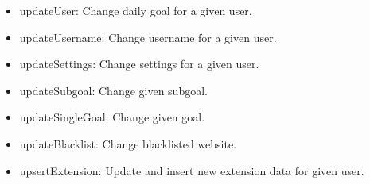 \documentclass[letterpaper, 10 pt]{report}
\begin{document}
\begin{itemize}
 \item updateUser: Change daily goal for a given user.
 \item updateUsername: Change username for a given user.
 \item updateSettings: Change settings for a given user.
 \item updateSubgoal: Change given subgoal.
 \item updateSingleGoal: Change given goal.
 \item updateBlacklist: Change blacklisted website.
 \item upsertExtension: Update and insert new extension data for given user.
 
\end{itemize}
\newpage
%

\end{document}
